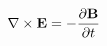 \documentclass[preview]{standalone}
\begin{document}
\begin{align*}
\special{dvisvgm:raw <g id='unique000'>}\nabla\times\mathbf E=-\frac{\partial\mathbf B}{\partial t}\special{dvisvgm:raw </g>}
\end{align*}
\end{document}
